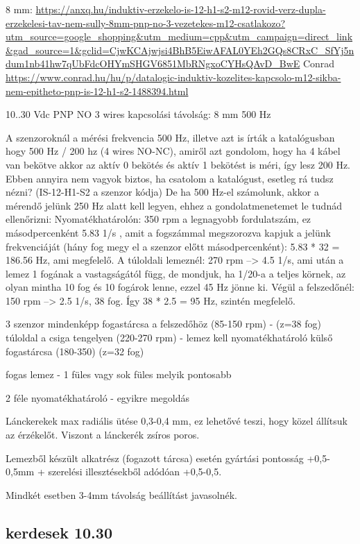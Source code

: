 \documentclass{article}
\begin{document}
	8 mm: \url{https://anxq.hu/induktiv-erzekelo-is-12-h1-s2-m12-rovid-verz-dupla-erzekelesi-tav-nem-sully-8mm-pnp-no-3-vezetekes-m12-csatlakozo?utm_source=google_shopping&utm_medium=cpp&utm_campaign=direct_link&gad_source=1&gclid=CjwKCAjwjsi4BhB5EiwAFAL0YEh2GQs8CRxC_SfYj5ndum1nb41hw7qUbFdcOHYmSHGV6851MbRNgxoCYHsQAvD_BwE}
	Conrad
	\url{https://www.conrad.hu/hu/p/datalogic-induktiv-kozelites-kapcsolo-m12-sikba-nem-epitheto-pnp-is-12-h1-s2-1488394.html}
	
	10..30 Vdc
	PNP NO
	3 wires
	kapcsolási távolság: 8 mm
	500 Hz
	
	A szenzoroknál a mérési frekvencia 500 Hz, illetve azt is írták a katalógusban hogy 500 Hz / 200 hz (4 wires NO-NC), amiről azt gondolom, hogy ha 4 kábel van bekötve akkor az aktív 0 bekötés és aktív 1 bekötést is méri, így lesz 200 Hz. Ebben annyira nem vagyok biztos, ha csatolom a katalógust, esetleg rá tudsz nézni? (IS-12-H1-S2 a szenzor kódja)
	De ha 500 Hz-el számolunk, akkor a mérendő jelünk 250 Hz alatt kell legyen, ehhez a gondolatmenetemet le tudnád ellenőrizni:
	Nyomatékhatárolón: 350 rpm a legnagyobb fordulatszám, ez másodpercenként 5.83 1/s , amit a fogszámmal megszorozva kapjuk a jelünk frekvenciáját (hány fog megy el a szenzor előtt másodpercenként): 5.83 * 32 = 186.56 Hz, ami megfelelő.
	A túloldali lemeznél: 270 rpm --> 4.5 1/s, ami után a lemez 1 fogának a vastagságától függ, de mondjuk, ha 1/20-a a teljes körnek, az olyan mintha 10 fog és 10 fogárok lenne, ezzel 45 Hz jönne ki.
	Végül a felszedőnél: 150 rpm --> 2.5 1/s, 38 fog. Így 38 * 2.5 = 95 Hz, szintén megfelelő.	
	
	
	3 szenzor mindenképp
	fogastárcsa a felszedőhöz (85-150 rpm) - (z=38 fog)
	túloldal a csiga tengelyen (220-270 rpm) - lemez kell
	nyomatékhatároló külső fogastárcsa (180-350) (z=32 fog)
	
	fogas lemez - 1 füles vagy sok füles melyik pontosabb
	
	2 féle nyomatékhatároló - egyikre megoldás
	
	Lánckerekek max radiális ütése 0,3-0,4 mm, ez lehetővé teszi, hogy közel állítsuk az érzékelőt. Viszont a lánckerék zsíros poros.
	
	Lemezből készült alkatrész (fogazott tárcsa) esetén gyártási pontosság +0,5-0,5mm + szerelési illesztésekből adódóan +0,5-0,5.
	
	Mindkét esetben 3-4mm távolság beállítást javasolnék. 
	
	\subsection{kerdesek 10.30}
	
\end{document}
